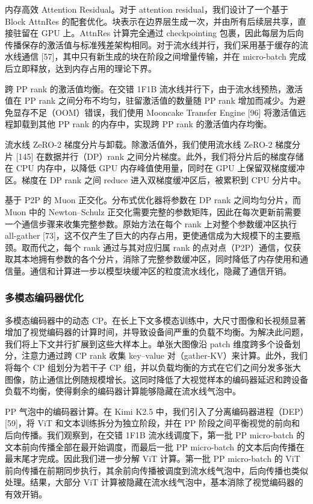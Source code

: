 \documentclass[
  10
]{article}
\begin{document}
内存高效 Attention Residual。对于 attention residual，我们设计了一个基于 Block AttnRes 的配套优化。块表示在边界层生成一次，并由所有后续层共享，直接驻留在 GPU 上。AttnRes 计算完全通过 checkpointing 包裹，因此每层为后向传播保存的激活值与标准残差架构相同。对于流水线并行，我们采用基于缓存的流水线通信 {[}57{]}，其中只有新生成的块在阶段之间增量传输，并在 micro-batch 完成后立即释放，达到内存占用的理论下界。

跨 PP rank 的激活值均衡。在交错 1F1B 流水线并行下，由于流水线预热，激活值在 PP rank 之间分布不均匀，驻留激活值的数量随 PP rank 增加而减少。为避免显存不足（OOM）错误，我们使用 Mooncake Transfer Engine {[}96{]} 将激活值远程卸载到其他 PP rank 的内存中，实现跨 PP rank 的激活值内存均衡。

流水线 ZeRO-2 梯度分片与卸载。除激活值外，我们使用流水线 ZeRO-2 梯度分片 {[}145{]} 在数据并行（DP）rank 之间分片梯度。此外，我们将分片后的梯度存储在 CPU 内存中，以降低 GPU 内存峰值使用量，同时在 GPU 上保留双梯度缓冲区。梯度在 DP rank 之间 reduce 进入双梯度缓冲区后，被累积到 CPU 分片中。

基于 P2P 的 Muon 正交化。分布式优化器将参数在 DP rank 之间均匀分片，而 Muon 中的 Newton--Schulz 正交化需要完整的参数矩阵，因此在每次更新前需要一个通信步骤来收集完整参数。原始方法在每个 rank 上对整个参数缓冲区执行 all-gather {[}73{]}，这不仅产生了巨大的内存占用，更使通信成为大规模下的主要瓶颈。取而代之，每个 rank 通过与其对应归属 rank 的点对点（P2P）通信，仅获取其本地拥有参数的各个分片，消除了完整参数缓冲区，同时降低了内存使用和通信量。通信和计算进一步以模型块缓冲区的粒度流水线化，隐藏了通信开销。

\subsubsection{多模态编码器优化}\label{multimodal-encoder-optimization}

多模态编码器中的动态 CP。在长上下文多模态训练中，大尺寸图像和长视频显著增加了视觉编码器的计算时间，并导致设备间严重的负载不均衡。为解决此问题，我们将上下文并行扩展到这些大样本上。单张大图像沿 patch 维度跨多个设备划分，注意力通过跨 CP rank 收集 key--value 对（gather-KV）来计算。此外，我们将每个 CP 组划分为若干子 CP 组，并以负载均衡的方式在它们之间分发多张大图像，防止通信比例随规模增长。这同时降低了大视觉样本的编码器延迟和跨设备负载不均衡，使得剩余的编码器计算能够隐藏在流水线气泡中。

PP 气泡中的编码器计算。在 Kimi K2.5 中，我们引入了分离编码器进程（DEP）{[}59{]}，将 ViT 和文本训练拆分为独立阶段，并在 PP 阶段之间平衡视觉的前向和后向传播。我们观察到，在交错 1F1B 流水线调度下，第一批 PP micro-batch 的文本前向传播全部在最开始调度，而最后一批 PP micro-batch 的文本后向传播在最末尾才完成。因此我们进一步分解 ViT 计算。第一批 PP micro-batch 的 ViT 前向传播在前期同步执行，其余前向传播被调度到流水线气泡中，后向传播也类似处理。结果，大部分 ViT 计算被隐藏在流水线气泡中，基本消除了视觉编码器的有效开销。
\end{document}
